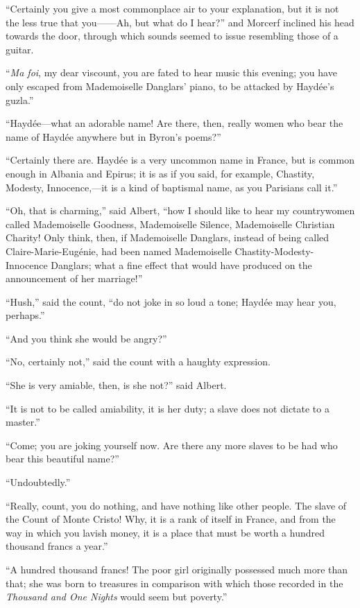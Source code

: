 “Certainly you give a most commonplace air to your explanation, but it
is not the less true that you——Ah, but what do I hear?” and Morcerf
inclined his head towards the door, through which sounds seemed to
issue resembling those of a guitar.

“\textit{Ma foi}, my dear viscount, you are fated to hear music this evening;
you have only escaped from Mademoiselle Danglars’ piano, to be attacked
by Haydée’s guzla.”

“Haydée—what an adorable name! Are there, then, really women who bear
the name of Haydée anywhere but in Byron’s poems?”

“Certainly there are. Haydée is a very uncommon name in France, but is
common enough in Albania and Epirus; it is as if you said, for example,
Chastity, Modesty, Innocence,—it is a kind of baptismal name, as you
Parisians call it.”

“Oh, that is charming,” said Albert, “how I should like to hear my
countrywomen called Mademoiselle Goodness, Mademoiselle Silence,
Mademoiselle Christian Charity! Only think, then, if Mademoiselle
Danglars, instead of being called Claire-Marie-Eugénie, had been named
Mademoiselle Chastity-Modesty-Innocence Danglars; what a fine effect
that would have produced on the announcement of her marriage!”

“Hush,” said the count, “do not joke in so loud a tone; Haydée may hear
you, perhaps.”

“And you think she would be angry?”

“No, certainly not,” said the count with a haughty expression.

“She is very amiable, then, is she not?” said Albert.

“It is not to be called amiability, it is her duty; a slave does not
dictate to a master.”

“Come; you are joking yourself now. Are there any more slaves to be had
who bear this beautiful name?”

“Undoubtedly.”

“Really, count, you do nothing, and have nothing like other people. The
slave of the Count of Monte Cristo! Why, it is a rank of itself in
France, and from the way in which you lavish money, it is a place that
must be worth a hundred thousand francs a year.”

“A hundred thousand francs! The poor girl originally possessed much
more than that; she was born to treasures in comparison with which
those recorded in the \textit{Thousand and One Nights} would seem but
poverty.”

